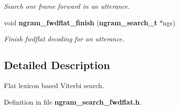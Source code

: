 \begin{DoxyCompactItemize}
\begin{DoxyCompactList}\small\item\em \-Search one frame forward in an utterance. \end{DoxyCompactList}\item 
void {\bf ngram\-\_\-fwdflat\-\_\-finish} ({\bf ngram\-\_\-search\-\_\-t} $\ast$ngs)\label{ngram__search__fwdflat_8h_ac855cf540ac4acdfa320629720ded6fe}

\begin{DoxyCompactList}\small\item\em \-Finish fwdflat decoding for an utterance. \end{DoxyCompactList}\end{DoxyCompactItemize}


\subsection{\-Detailed \-Description}
\-Flat lexicon based \-Viterbi search. 

\-Definition in file {\bf ngram\-\_\-search\-\_\-fwdflat.\-h}.

